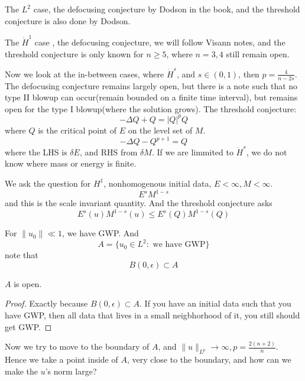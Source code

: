 The $L^2$ case, the defocusing conjecture by Dodson in the book, and the threshold conjecture is also done by Dodson.

The $\dot{H}^1$ case , the defocusing conjecture, we will follow Visann notes, and the threshold conjecture is only known for $n\geq 5$, where $n=3,4$ still remain open.

Now we look at the in-between cases, where $\dot{H}^s$, and $s\in (0,1)$, then $p=\frac{4}{n-2s}$. The defocusing conjecture remains largely open, but there is a note such that no type II blowup can occur(remain bounded on a finite time interval), but remains open for the type I blowup(where the solution grows). The threshold conjecture: 
\begin{equation*}
    -\Delta Q+Q=|Q|^pQ
\end{equation*}
where $Q$ is the critical point of $E$ on the level set of $M$.
\begin{equation*}
    -\Delta Q-Q^{p+1}=Q
\end{equation*}
where the LHS is $\delta E$, and RHS from $\delta M$. If we are limmited to $\dot{H}^s$, we do not know where mass or energy is finite. 

We ask the question for $H^1$, nonhomogenous initial data, $E<\infty, M<\infty$.
\begin{equation*}
    E^s M^{1-s}
\end{equation*}
and this is the scale invariant quantity. And the threshold conjecture asks
\begin{equation*}
    E^s(u)M^{1-s}(u)\leq E^s(Q)M^{1-s}(Q)
\end{equation*}

For $\|u_0\|\ll 1$, we have GWP. And
\begin{equation*}
    A=\{u_0\in L^2: \text{ we have GWP}\} 
\end{equation*}
note that
\begin{equation*}
    B(0,\epsilon)\subset A
\end{equation*}
\begin{proposition}
    $A$ is open.
\end{proposition}
\begin{proof}
    Exactly because $B(0,\epsilon)\subset A$. If you have an initial data such that you have GWP, then all data that lives in a small neigbhorhood of it, you still should get GWP.
\end{proof}

Now we try to move to the boundary of $A$, and $\|u\|_{L^p}\to\infty, p=\frac{2(n+2)}{n}$. Hence we take a point inside of $A$, very close to the boundary, and how can we make the $u$'s norm large?

